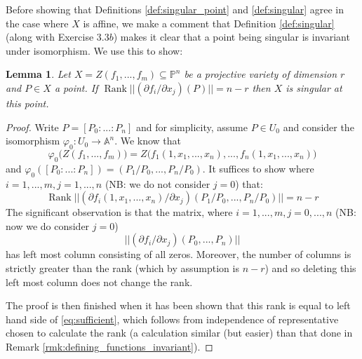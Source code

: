 \documentclass[12pt]{article}
\theoremstyle{plain}
\newtheorem{lemma}[thm]{Lemma}
\theoremstyle{definition}
\newcommand{\bb}[1]{\mathbb{#1}}
\newcommand{\lto}{\longrightarrow}
\begin{document}
Before showing that Definitions \ref{def:singular_point} and \ref{def:singular} agree in the case where $X$ is affine, we make a comment that Definition \ref{def:singular} (along with Exercise $3.3b$) makes it clear that a point being singular is invariant under isomorphism. We use this to show:
\begin{lemma}
Let $X = Z(f_1,...,f_m) \subseteq \bb{P}^n$ be a projective variety of dimension $r$ and $P \in X$ a point. If $\operatorname{Rank}||(\partial f_i/\partial x_j)(P)|| = n - r$ then $X$ is singular at this point.
\end{lemma}
\begin{proof}
Write $P = [P_0:...:P_n]$ and for simplicity, assume $P \in U_0$ and consider the isomorphism $\varphi_0: U_0 \lto \bb{A}^n$. We know that
\[\varphi_0\big(Z(f_1,...,f_m)\big) = Z\big(f_1(1,x_1,...,x_n),...,f_n(1,x_1,...,x_n)\big)\]
and $\varphi_0([P_0:...:P_n]) = (P_1/P_0,...,P_n/P_0)$. It suffices to show where $i=1,...,m,j=1,...,n$ (NB: we do not consider $j = 0$) that:
\begin{equation}\label{eq:sufficient}
\operatorname{Rank}||(\partial f_i(1,x_1,...,x_n)/\partial x_j)(P_1/P_0,...,P_n/P_0)|| = n - r
\end{equation}
The significant observation is that the matrix, where $i=1,...,m,j = 0,...,n$ (NB: now we do consider $j = 0$)
\[||(\partial f_i/\partial x_j)(P_0,...,P_n)||\]
has left most column consisting of all zeros. Moreover, the number of columns is strictly greater than the rank (which by assumption is $n - r$) and so deleting this left most column does not change the rank.

The proof is then finished when it has been shown that this rank is equal to left hand side of \eqref{eq:sufficient}, which follows from independence of representative chosen to calculate the rank (a calculation similar (but easier) than that done in Remark \ref{rmk:defining_functions_invariant}).
\end{proof}
\end{document}
